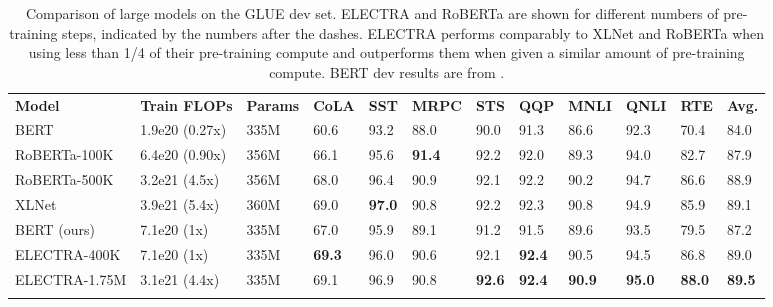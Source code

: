 \documentclass{article}
\newcommand\tstrut{\rule{0pt}{2.6ex}}
\newcommand\bstrut{\rule[-1.0ex]{0pt}{0pt}}
\newcommand{\thinline}{\Xhline{1.5\arrayrulewidth}}
\newcommand{\thickline}{\Xhline{2.5\arrayrulewidth}}
\newcommand{\tsep}	{\bstrut \\ \thinline}
\newcommand{\ttop}{\thickline}
\newcommand{\tbottom}{\bstrut \\ \thickline}
\begin{document}
\addtolength{\tabcolsep}{-3.5pt}
\begin{table}[t!]
\small
\begin{center}
\begin{tabularx}{\linewidth}{X l l l l l l l l l l l}
\ttop 
\textbf{Model} & \textbf{Train FLOPs} & \textbf{Params} & \textbf{CoLA} & \textbf{SST} & \textbf{MRPC} & \textbf{STS} & \textbf{QQP} & \textbf{MNLI} & \textbf{QNLI} & \textbf{RTE} & \textbf{Avg.} \tstrut \tsep 
BERT      &  1.9e20 (0.27x)  & 335M  & 60.6 & 93.2 & 88.0 & 90.0 & 91.3 & 86.6 & 92.3 & 70.4 & 84.0 \tstrut \\
RoBERTa-100K      &  6.4e20 (0.90x) & 356M    & 66.1 & 95.6 & \textbf{91.4} & 92.2 & 92.0 & 89.3 & 94.0 & 82.7& 87.9  \\
RoBERTa-500K      &  3.2e21 (4.5x) & 356M   & 68.0 & 96.4 & 90.9 & 92.1 & 92.2 & 90.2 & 94.7 & 86.6 & 88.9 \\
XLNet      & 3.9e21 (5.4x) &  360M  & 69.0 & \textbf{97.0} & 90.8 & 92.2 & 92.3 & 90.8 & 94.9 & 85.9 & 89.1 \tsep
BERT (ours) &  7.1e20 (1x) & 335M  & 67.0 & 95.9 & 89.1 & 91.2 & 91.5 & 89.6 & 93.5 & 79.5 & 87.2  \tstrut \\
ELECTRA-400K      &  7.1e20 (1x) & 335M    & \textbf{69.3} & 96.0 & 90.6 & 92.1 & \textbf{92.4} & 90.5 & 94.5 & 86.8 & 89.0 \\ 
ELECTRA-1.75M      &  3.1e21 (4.4x) & 335M    & 69.1 & 96.9 & 90.8 & \textbf{92.6} & \textbf{92.4} & \textbf{90.9} & \textbf{95.0} & \textbf{88.0} & \textbf{89.5} \tbottom

\end{tabularx} 
\end{center}
\vspace{-1mm}
\caption{Comparison of large models on the GLUE dev set. ELECTRA and RoBERTa are shown for different numbers of pre-training steps, indicated by the numbers after the dashes. ELECTRA performs comparably to XLNet and RoBERTa when using less than 1/4 of their pre-training compute and outperforms them when given a similar amount of pre-training compute. BERT dev results are from \citet{Clark2019BAMBM}.}
\label{tab:large}
\end{table}
\addtolength{\tabcolsep}{3.5pt}
\vspace{-1mm}
\end{document}
